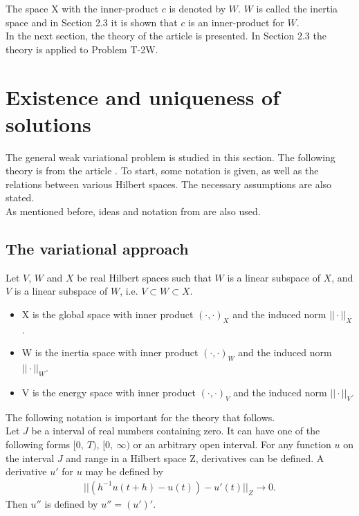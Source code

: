 \documentclass[../../main.tex]{subfiles}
\begin{document}
The space X with the inner-product $c$ is denoted by $W$. $W$ is called the inertia space and in Section 2.3 it is shown that $c$ is an inner-product for $W$.\\

In the next section, the theory of the article \cite{VV02} is presented. In Section 2.3 the theory is applied to Problem T-2W.

\section{Existence and uniqueness of solutions}\label{sec:existence:ExistenceAndUniqueness}
The general weak variational problem is studied in this section. The following theory is from the article \cite{VV02}. To start, some notation is given, as well as the relations between various Hilbert spaces. The necessary assumptions are also stated.\\

As mentioned before, ideas and notation from \cite{VS19} are also used.

\subsection{The variational approach}\label{ssec:existence:VariationlApproach}
Let $V$, $W$ and $X$ be real Hilbert spaces such that $W$ is a linear subspace of $X$, and $V$ is a linear subspace of $W$, i.e. $V \subset W \subset X$.
\begin{itemize}
	\item[] X is the global space with inner product $(\cdot,\cdot)_X$ and the induced norm $||\cdot||_X$.
	\item[] W is the inertia space with inner product $(\cdot,\cdot)_W$ and the induced norm $||\cdot||_W$.
	\item[] V is the energy space with inner product $(\cdot,\cdot)_V$ and the induced norm $||\cdot||_V$.
\end{itemize}

The following notation is important for the theory that follows.\\

Let $J$ be a interval of real numbers containing zero. It can have one of the following forms $[0,\ T)$, $[0,\ \infty)$ or an arbitrary open interval. For any function $u$ on the interval $J$ and range in a Hilbert space Z, derivatives can be defined. A derivative $u'$ for $u$ may be defined by
\begin{eqnarray*}
	||(h^{-1} u(t+h)-u(t))-u'(t)||_Z \rightarrow 0.
\end{eqnarray*} Then $u''$ is defined by $u'' = (u')'$.\\
\end{document}
